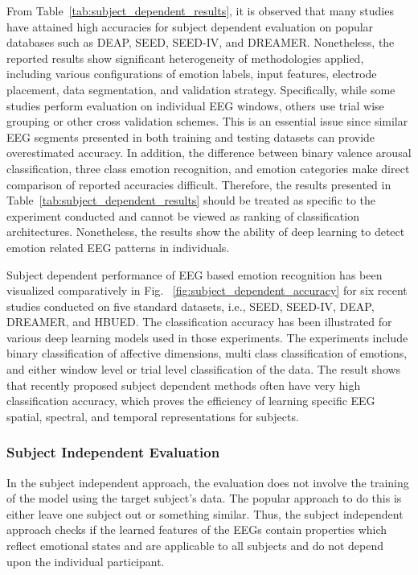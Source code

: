 \documentclass[ASNA,twocolumn]{USG}
\begin{document}
From Table~\ref{tab:subject_dependent_results}, it is observed that many studies have attained high accuracies for subject dependent evaluation on popular databases such as DEAP, SEED, SEED-IV, and DREAMER. Nonetheless, the reported results show significant heterogeneity of methodologies applied, including various configurations of emotion labels, input features, electrode placement, data segmentation, and validation strategy. Specifically, while some studies perform evaluation on individual EEG windows, others use trial wise grouping or other cross validation schemes. This is an essential issue since similar EEG segments presented in both training and testing datasets can provide overestimated accuracy. In addition, the difference between binary valence arousal classification, three class emotion recognition, and emotion categories make direct comparison of reported accuracies difficult. Therefore, the results presented in Table~\ref{tab:subject_dependent_results} should be treated as specific to the experiment conducted and cannot be viewed as ranking of classification architectures. Nonetheless, the results show the ability of deep learning to detect emotion related EEG patterns in individuals.




Subject dependent performance of EEG based emotion recognition has been visualized comparatively in Fig. ~\ref{fig:subject_dependent_accuracy} for six recent studies conducted on five standard datasets, i.e., SEED, SEED-IV, DEAP, DREAMER, and HBUED. The classification accuracy has been illustrated for various deep learning models used in those experiments. The experiments include binary classification of affective dimensions, multi class classification of emotions, and either window level or trial level classification of the data. The result shows that recently proposed subject dependent methods often have very high classification accuracy, which proves the efficiency of learning specific EEG spatial, spectral, and temporal representations for subjects.




\subsubsection{Subject Independent Evaluation}

\label{subsubsec:subject_independent_evaluation}

In the subject independent approach, the evaluation does not involve the training of the model using the target subject's data. The popular approach to do this is either leave one subject out or something similar. Thus, the subject independent approach checks if the learned features of the EEGs contain properties which reflect emotional states and are applicable to all subjects and do not depend upon the individual participant.
\end{document}
